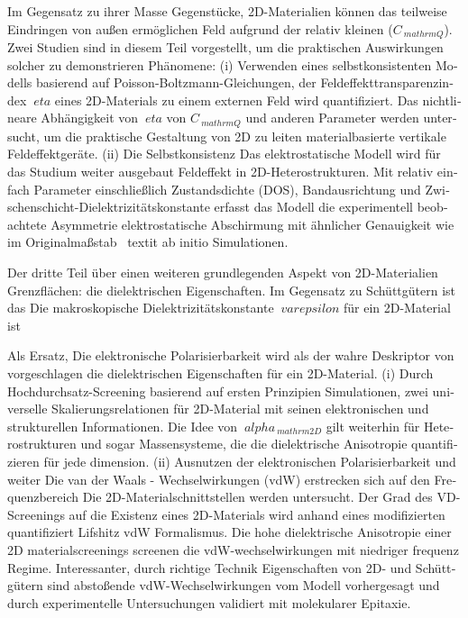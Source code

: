 \begin{otherlanguage}{ngerman}
Im Gegensatz zu ihrer Masse
Gegenstücke, 2D-Materialien können das teilweise Eindringen von außen ermöglichen
Feld aufgrund der relativ kleinen ($ C _ {\ mathrm {Q}} $).
%
Zwei Studien sind
in diesem Teil vorgestellt, um die praktischen Auswirkungen solcher zu demonstrieren
Phänomene:
%
(i) Verwenden eines selbstkonsistenten Modells basierend auf
Poisson-Boltzmann-Gleichungen, der Feldeffekttransparenzindex
$ \ eta $ eines 2D-Materials zu einem externen Feld wird quantifiziert. Das
nichtlineare Abhängigkeit von $ \ eta $ von $ C _ {\ mathrm {Q}} $ und anderen
Parameter werden untersucht, um die praktische Gestaltung von 2D zu leiten
materialbasierte vertikale Feldeffektgeräte.
%
(ii) Die Selbstkonsistenz
Das elektrostatische Modell wird für das Studium weiter ausgebaut
Feldeffekt in 2D-Heterostrukturen. Mit relativ einfach
Parameter einschließlich Zustandsdichte (DOS), Bandausrichtung und
Zwischenschicht-Dielektrizitätskonstante erfasst das Modell die experimentell beobachtete Asymmetrie
elektrostatische Abschirmung mit ähnlicher Genauigkeit wie im Originalmaßstab
\ textit {ab initio} Simulationen.


Der dritte Teil über einen weiteren grundlegenden Aspekt von 2D-Materialien
Grenzflächen: die dielektrischen Eigenschaften.
%
Im Gegensatz zu Schüttgütern ist das
Die makroskopische Dielektrizitätskonstante $ \ varepsilon $ für ein 2D-Material ist

%
Als Ersatz,
Die elektronische Polarisierbarkeit wird als der wahre Deskriptor von vorgeschlagen
die dielektrischen Eigenschaften für ein 2D-Material.
%
%
(i) Durch Hochdurchsatz-Screening basierend auf ersten Prinzipien
Simulationen, zwei universelle Skalierungsrelationen für
2D-Material mit seinen elektronischen und strukturellen Informationen.
%
Die Idee
von $ \ alpha _ {\ mathrm {2D}} $ gilt weiterhin für Heterostrukturen
und sogar Massensysteme, die die dielektrische Anisotropie quantifizieren
für jede dimension.
%
(ii) Ausnutzen der elektronischen Polarisierbarkeit und weiter
Die van der Waals - Wechselwirkungen (vdW) erstrecken sich auf den Frequenzbereich
Die 2D-Materialschnittstellen werden untersucht. Der Grad des VD-Screenings
auf die Existenz eines 2D-Materials wird anhand eines modifizierten quantifiziert
Lifshitz vdW Formalismus. Die hohe dielektrische Anisotropie einer 2D
materialscreenings screenen die vdW-wechselwirkungen mit niedriger frequenz
Regime. Interessanter, durch richtige Technik
Eigenschaften von 2D- und Schüttgütern sind abstoßende vdW-Wechselwirkungen
vom Modell vorhergesagt und durch experimentelle Untersuchungen validiert
mit molekularer Epitaxie.


\end{otherlanguage}
